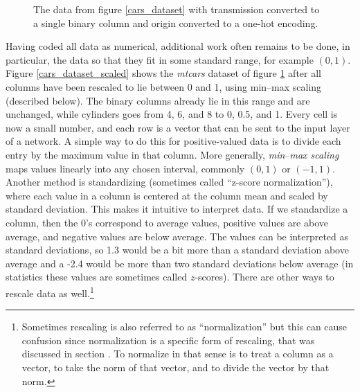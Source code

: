 \begin{figure}[h]
\centering
{}
\caption[Jeff Yoshimi, based on the Motor Trend Car Road Tests dataset included with R.]{The data from figure \ref{cars_dataset} with transmission converted to a single binary column and origin converted to a one-hot encoding.}
\label{cars_onehot}
\end{figure}

Having coded all data as numerical, additional work often remains to be done, in particular,  the data so that they fit in some standard range, for example $(0,1)$. Figure \ref{cars_dataset_scaled} shows the \emph{mtcars} dataset of figure \ref{cars_onehot} after all columns have been rescaled to lie between 0 and 1, using min--max scaling (described below). The binary columns already lie in this range and are unchanged, while cylinders goes from 4, 6, and 8 to 0, 0.5, and 1. Every cell is now a small number, and each row is a vector that can be sent to the input layer of a network. A simple way to do this for positive-valued data is to divide each entry by the maximum value in that column. More generally, \emph{min–max scaling} maps values linearly into any chosen interval, commonly $(0,1)$ or $(-1,1)$. Another method is standardizing (sometimes called ``z-score normalization''), where each value in a column is centered at the column mean and scaled by standard deviation. This makes it intuitive to interpret data. If we standardize a column, then the 0's correspond to average values, positive values are above average, and negative values are below average. The values can be interpreted as standard deviations, so 1.3 would be a bit more than a standard deviation above average and a -2.4 would be more than two standard deviations below average  (in statistics these values are sometimes called $z$-scores). There are other ways to rescale data as well.\footnote{Sometimes rescaling is also referred to as ``normalization'' but this can cause confusion since normalization is a specific form of rescaling, that was discussed in section . To normalize in that sense is to treat a column as a vector, to take the norm of that vector, and to divide the vector by that norm.}

